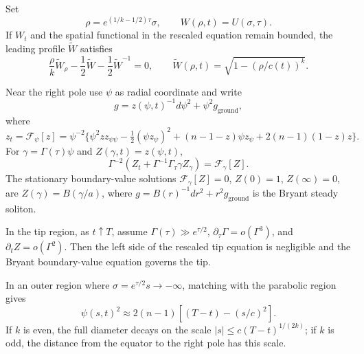 \begin{definition}
\label{def:chow-iv-intermediate-profile}


Set
\[
 \rho=e^{(1/k-1/2)\tau}\sigma,\qquad W(\rho,t)=U(\sigma,\tau).
\]
If $W_t$ and the spatial functional in the rescaled equation remain bounded,
the leading profile $\widetilde W$ satisfies
\[
 \frac\rho k\widetilde W_\rho-\frac12\widetilde W-\frac12\widetilde W^{-1}=0,
 \qquad \widetilde W(\rho,t)=\sqrt{1-(\rho/c(t))^k}.
\]
\end{definition}

\begin{definition}
\label{def:chow-iv-tip-bryant-profile}


Near the right pole use $\psi$ as radial coordinate and write
\[
 g=z(\psi,t)^{-1}d\psi^2+\psi^2g_{\mathrm{ground}},
\]
where
\[
 z_t=\mathcal F_\psi[z]=\psi^{-2}\{\psi^2zz_{\psi\psi}
 -\tfrac12(\psi z_\psi)^2+(n-1-z)\psi z_\psi+2(n-1)(1-z)z\}.
\]
For $\gamma=\Gamma(\tau)\psi$ and $Z(\gamma,t)=z(\psi,t)$,
\[
 \Gamma^{-2}(Z_t+\Gamma^{-1}\Gamma_\tau\gamma Z_\gamma)=\mathcal F_\gamma[Z].
\]
The stationary boundary-value solutions $\mathcal F_\gamma[Z]=0$,
$Z(0)=1$, $Z(\infty)=0$, are
$Z(\gamma)=B(\gamma/a)$, where
$g=B(r)^{-1}dr^2+r^2g_{\mathrm{ground}}$ is the Bryant steady soliton.
\end{definition}

\begin{definition}
\label{def:chow-iv-tip-ansatz}


In the tip region, as $t\uparrow T$, assume
$\Gamma(\tau)\gg e^{\tau/2}$, $\partial_\tau\Gamma=o(\Gamma^3)$, and
$\partial_tZ=o(\Gamma^2)$.  Then the left side of the rescaled tip equation
is negligible and the Bryant boundary-value equation governs the tip.
\end{definition}

\begin{proposition}
\label{prop:chow-iv-outer-profile}


In an outer region where $\sigma=e^{\tau/2}s\to-\infty$, matching with the
parabolic region gives
\[
 \psi(s,t)^2\approx2(n-1)\left[(T-t)-(s/c)^2\right].
\]
If $k$ is even, the full diameter decays on the scale
$|s|\le c(T-t)^{1/(2k)}$; if $k$ is odd, the distance from the equator to the
right pole has this scale.
\end{proposition}

